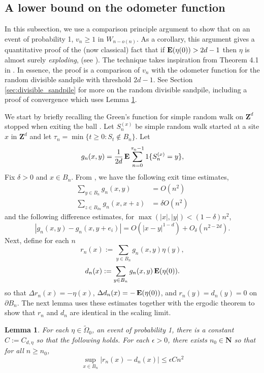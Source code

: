 \documentclass[12pt]{amsart}
\newcommand{\Z}{\mathbf{Z}}
\newcommand{\N}{\mathbf{N}}
\newcommand{\E}{\mathop{\bf E{}}}
\newtheorem{lemma}[theorem]{Lemma}
\begin{document}
\subsection{A lower bound on the odometer function}
In this subsection, we use a comparison principle argument to show that on an event of probability 1,  $v_n \geq 1$ in $W_{n - o(n)}$.
As a corollary, this argument gives a quantitative proof of the (now classical) fact that if $\E(\eta(0)) > 2 d -1$ then $\eta$ is almost surely {\it exploding}, (see \cite{fey2009stabilizability}). 
The technique takes inspiration from Theorem 4.1 in \cite{levine2009strong}. In essence, the proof is a comparison of $v_n$ with the odometer function for the random divisible sandpile with threshold $2 d-1$. See Section \ref{sec:divisible_sandpile} for more on the random divisible sandpile, including a proof of convergence which uses 
Lemma \ref{divisible_homogenize}. 

We start by briefly recalling the Green's function for simple random walk on $\Z^d$ stopped when exiting the ball .
Let $S_n^{(x)}$ be simple random walk started at a site $x$ in $\Z^d$ and let $\tau_n = \min\{t \geq 0: S_{t} \not \in B_n \}$.
Let 	
\[
g_n(x,y) = \frac{1}{2d } \E \sum_{n=0}^{\tau_{n}-1} 1\{S_n^{(x)} = y\}, 
\]
Fix $\delta > 0$ and $x \in B_n$. From \cite{lawler2010random}, we have the following exit time estimates, 
\begin{equation} \label{exit_time}
\begin{aligned}
\sum_{y \in B_n} g_n(x,y)  &= O(n^2) \\ 
\sum_{z \in B_{\delta n}} g_n(x,x+z) &= \delta O(n^2)
\end{aligned}
\end{equation}
and the following difference estimates, for $\max(|x|,|y|) < (1-\delta) n^2$,
\begin{equation} \label{difference}
|g_n(x,y) - g_n(x,y + e_i)| = O(|x-y|^{1-d}) + O_{\delta}(n^{2-2d}).
\end{equation}
Next, define for each $n$ 
\[
r_n(x) := \sum_{y \in B_{n}} g_{n}(x,y) \eta(y),
\]
\[
d_n(x) :=  \sum_{y \in B_{n}} g_{n}(x,y) \E(\eta(0)).
\]
so that $\Delta r_n(x) = - \eta(x)$, $\Delta d_n(x) = -\E(\eta(0))$, and $r_n(y) = d_n(y) = 0$ on $\partial B_n$. 
The next lemma uses these estimates together with the ergodic theorem to show that $r_n$ and $d_n$ are identical in the scaling limit. 

\begin{lemma}\label{divisible_homogenize}
For each $\eta \in \tilde{\Omega}_0$, an event of probability 1, there is a constant $C := C_{d, \eta}$ so that the following holds. 
For each $\epsilon > 0$, there exists $n_0 \in \N$ so that for all  $n \geq n_0$, 
\begin{equation}\label{eq:divisible_homogenize}
\sup_{x \in B_n} \left| r_n(x) -d_n(x) \right| \leq \epsilon C n^2
\end{equation}
\end{lemma}
\end{document}
